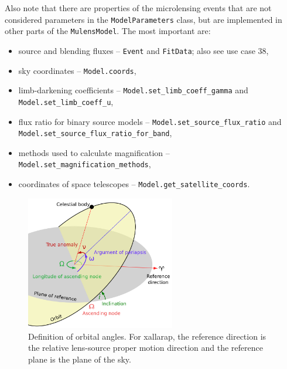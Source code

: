 \documentclass[12pt]{article}
\begin{document}
Also note that there are properties of the microlensing events that are not considered parameters in the \texttt{ModelParameters} class, but are implemented in other parts of the \texttt{MulensModel}. The most important are:
\begin{itemize}
 \item source and blending fluxes -- \texttt{Event} and \texttt{FitData}; also see use case 38,
 \item sky coordinates -- \texttt{Model.coords},
 \item limb-darkening coefficients -- \texttt{Model.set\_limb\_coeff\_gamma} and \texttt{Model.set\_limb\_coeff\_u},
 \item flux ratio for binary source models -- \texttt{Model.set\_source\_flux\_ratio} and\\ \texttt{Model.set\_source\_flux\_ratio\_for\_band},
 \item methods used to calculate magnification -- \texttt{Model.set\_magnification\_methods},
 \item coordinates of space telescopes -- \texttt{Model.get\_satellite\_coords}.
\end{itemize}

\begin{figure}
\centering
\includegraphics[width=0.58\textwidth]{images/orbit_parameters/Orbit1_svg}
\caption{
Definition of orbital angles. 
For xallarap, the reference direction is the relative lens-source proper motion direction and the reference plane is the plane of the sky.
}
\end{figure}
\end{document}
